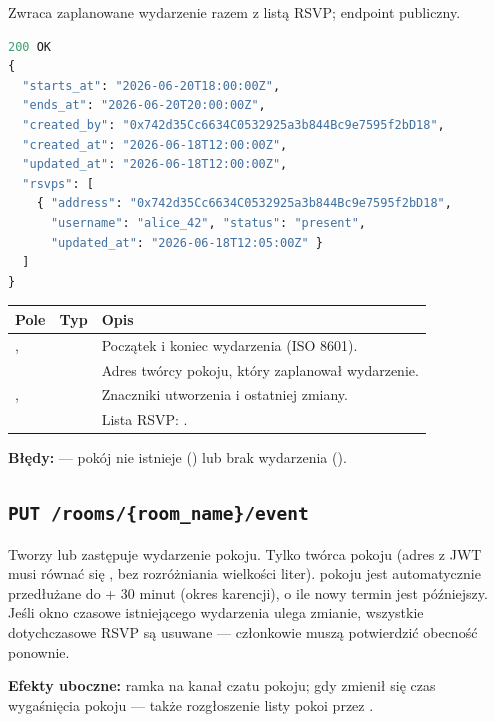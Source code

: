 Zwraca zaplanowane wydarzenie razem z listą RSVP; endpoint publiczny.

\begin{lstlisting}[language=Python]
200 OK
{
  "starts_at": "2026-06-20T18:00:00Z",
  "ends_at": "2026-06-20T20:00:00Z",
  "created_by": "0x742d35Cc6634C0532925a3b844Bc9e7595f2bD18",
  "created_at": "2026-06-18T12:00:00Z",
  "updated_at": "2026-06-18T12:00:00Z",
  "rsvps": [
    { "address": "0x742d35Cc6634C0532925a3b844Bc9e7595f2bD18",
      "username": "alice_42", "status": "present",
      "updated_at": "2026-06-18T12:05:00Z" }
  ]
}
\end{lstlisting}

\begin{tabularx}{\textwidth}{llY}
\toprule
Pole & Typ & Opis \\
\midrule
{},  &  & Początek i koniec wydarzenia (ISO 8601). \\
 &  & Adres twórcy pokoju, który zaplanował wydarzenie. \\
,  &  & Znaczniki utworzenia i ostatniej zmiany. \\
 &  & Lista RSVP: . \\
\bottomrule
\end{tabularx}

\textbf{Błędy:}  --- pokój nie istnieje () lub brak wydarzenia
().

\subsection{\texttt{PUT /rooms/\{room\_name\}/event}}

Tworzy lub zastępuje wydarzenie pokoju. Tylko twórca pokoju (adres z JWT musi równać się
, bez rozróżniania wielkości liter).  pokoju jest automatycznie
przedłużane do  + 30 minut (okres karencji), o ile nowy termin jest późniejszy.
Jeśli okno czasowe istniejącego wydarzenia ulega zmianie, wszystkie dotychczasowe RSVP są usuwane
--- członkowie muszą potwierdzić obecność ponownie.

\textbf{Efekty uboczne:} ramka  na kanał czatu pokoju; gdy zmienił się czas
wygaśnięcia pokoju --- także rozgłoszenie listy pokoi przez .

